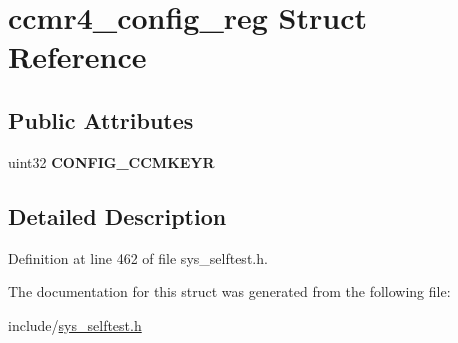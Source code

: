 \hypertarget{structccmr4__config__reg}{}\section{ccmr4\+\_\+config\+\_\+reg Struct Reference}
\label{structccmr4__config__reg}
\subsection*{Public Attributes}
\begin{DoxyCompactItemize}
\item 
\mbox{\label{structccmr4__config__reg_a0dab05cea4994d28eb085a3256ccd525}} 
uint32 {\bfseries C\+O\+N\+F\+I\+G\+\_\+\+C\+C\+M\+K\+E\+YR}
\end{DoxyCompactItemize}


\subsection{Detailed Description}


Definition at line 462 of file sys\+\_\+selftest.\+h.



The documentation for this struct was generated from the following file\+:\begin{DoxyCompactItemize}
\item 
include/\mbox{\hyperlink{sys__selftest_8h}{sys\+\_\+selftest.\+h}}\end{DoxyCompactItemize}
